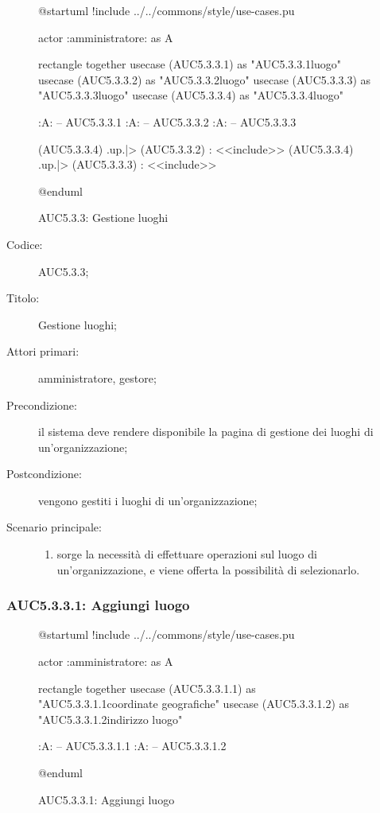 \documentclass[../../../analisi-dei-requisiti.tex]{subfiles}
\begin{document}
\begin{figure}[H]
  \centering
  \begin{plantuml}
  @startuml
  !include ../../commons/style/use-cases.pu

  actor :amministratore: as A

  rectangle {
    together {
      usecase (AUC5.3.3.1) as "AUC5.3.3.1\nAggiungi luogo"
      usecase (AUC5.3.3.2) as "AUC5.3.3.2\nEliminazione luogo"
      usecase (AUC5.3.3.3) as "AUC5.3.3.3\nModifica luogo"
    }
    usecase (AUC5.3.3.4) as "AUC5.3.3.4\nSeleziona luogo"
  }

  :A: -- AUC5.3.3.1
  :A: -- AUC5.3.3.2
  :A: -- AUC5.3.3.3

  (AUC5.3.3.4) .up.|> (AUC5.3.3.2) : <<include>>
  (AUC5.3.3.4) .up.|> (AUC5.3.3.3) : <<include>>

  @enduml
  \end{plantuml}
  \caption{AUC5.3.3: Gestione luoghi}%
  \label{fig:AUC5_3_3}
\end{figure}

\begin{description}
  \item[Codice:] AUC5.3.3;
  \item[Titolo:] Gestione luoghi;
  \item[Attori primari:] amministratore, gestore;
  \item[Precondizione:] il sistema deve rendere disponibile la pagina di gestione dei luoghi di un'organizzazione;
  \item[Postcondizione:] vengono gestiti i luoghi di un'organizzazione;
  \item[Scenario principale:]
  \begin{enumerate}
    \item sorge la necessità di effettuare operazioni sul luogo di un'organizzazione, e viene offerta la possibilità di selezionarlo.
  \end{enumerate}
\end{description}

\subsubsection{AUC5.3.3.1: Aggiungi luogo}%
\label{subs:AUC5.3.3.1}

\begin{figure}[H]
  \centering
  \begin{plantuml}
  @startuml
  !include ../../commons/style/use-cases.pu

  actor :amministratore: as A

  rectangle {
    together {
      usecase (AUC5.3.3.1.1) as "AUC5.3.3.1.1\nInserisci coordinate geografiche"
      usecase (AUC5.3.3.1.2) as "AUC5.3.3.1.2\nInserisci indirizzo luogo"
    }
  }

  :A: -- AUC5.3.3.1.1
  :A: -- AUC5.3.3.1.2

  @enduml
  \end{plantuml}
  \caption{AUC5.3.3.1: Aggiungi luogo}%
  \label{fig:AUC5_3_3_1}
\end{figure}
\end{document}

